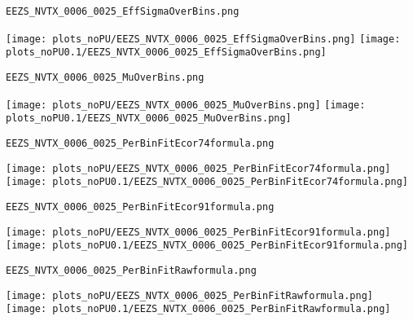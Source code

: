 \begin{frame}[fragile]
\begin{verbatim}
EEZS_NVTX_0006_0025_EffSigmaOverBins.png
\end{verbatim}
\texttt{[image: plots\_noPU/EEZS\_NVTX\_0006\_0025\_EffSigmaOverBins.png]}
\texttt{[image: plots\_noPU0.1/EEZS\_NVTX\_0006\_0025\_EffSigmaOverBins.png]}
\end{frame}
\begin{frame}[fragile]
\begin{verbatim}
EEZS_NVTX_0006_0025_MuOverBins.png
\end{verbatim}
\texttt{[image: plots\_noPU/EEZS\_NVTX\_0006\_0025\_MuOverBins.png]}
\texttt{[image: plots\_noPU0.1/EEZS\_NVTX\_0006\_0025\_MuOverBins.png]}
\end{frame}
\begin{frame}[fragile]
\begin{verbatim}
EEZS_NVTX_0006_0025_PerBinFitEcor74formula.png
\end{verbatim}
\texttt{[image: plots\_noPU/EEZS\_NVTX\_0006\_0025\_PerBinFitEcor74formula.png]}
\texttt{[image: plots\_noPU0.1/EEZS\_NVTX\_0006\_0025\_PerBinFitEcor74formula.png]}
\end{frame}
\begin{frame}[fragile]
\begin{verbatim}
EEZS_NVTX_0006_0025_PerBinFitEcor91formula.png
\end{verbatim}
\texttt{[image: plots\_noPU/EEZS\_NVTX\_0006\_0025\_PerBinFitEcor91formula.png]}
\texttt{[image: plots\_noPU0.1/EEZS\_NVTX\_0006\_0025\_PerBinFitEcor91formula.png]}
\end{frame}
\begin{frame}[fragile]
\begin{verbatim}
EEZS_NVTX_0006_0025_PerBinFitRawformula.png
\end{verbatim}
\texttt{[image: plots\_noPU/EEZS\_NVTX\_0006\_0025\_PerBinFitRawformula.png]}
\texttt{[image: plots\_noPU0.1/EEZS\_NVTX\_0006\_0025\_PerBinFitRawformula.png]}
\end{frame}
